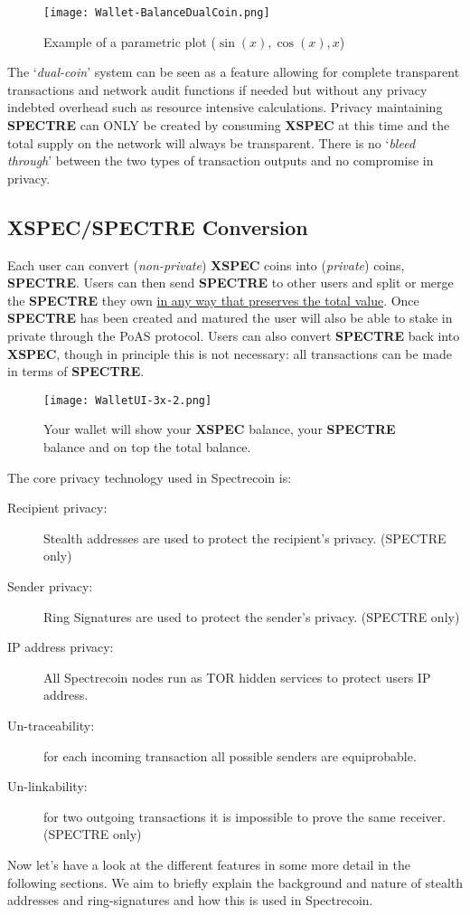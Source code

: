 \begin{figure}[ht]
	\caption{Example of a parametric plot ($\sin (x), \cos(x), x$)}
	\centering
	\texttt{[image: Wallet-BalanceDualCoin.png]}
\end{figure}



The ‘\textit{dual-coin}’ system can be seen as a feature allowing for complete
transparent transactions and network audit functions if needed but
without any privacy indebted overhead such as resource intensive
calculations. Privacy maintaining \textbf{SPECTRE} can ONLY be created by
consuming \textbf{XSPEC} at this time and the total supply on the network
will always be transparent. There is no ‘\textit{bleed through}’ between the
two types of transaction outputs and no compromise in privacy.



\subsection{XSPEC/SPECTRE Conversion}
Each user can convert (\textit{non-private}) \textbf{XSPEC} coins into 
(\textit{private}) coins, \textbf{SPECTRE}. Users can then send \textbf{SPECTRE} 
to other users and split or merge the \textbf{SPECTRE} they own \underline{in any 
way that preserves the total value}. Once \textbf{SPECTRE} has been created
and matured the user will also be able to stake in private through the PoAS
protocol. Users can also convert \textbf{SPECTRE} back into \textbf{XSPEC}, 
though in principle this is not necessary: all transactions can be made in 
terms of \textbf{SPECTRE}.



\begin{figure}[ht]
	\caption{Your wallet will show your \textbf{XSPEC} balance, your 
		\textbf{SPECTRE} balance and on top the total balance.}
	\centering
	\texttt{[image: WalletUI-3x-2.png]}
\end{figure}




The core privacy technology used in Spectrecoin is: 



\begin{description}
	\item[Recipient privacy:] Stealth addresses are used to protect the 
	recipient’s privacy. (SPECTRE only)
	\item[Sender privacy:] Ring Signatures are used to protect the 
	sender’s privacy. (SPECTRE only)
	\item[IP address privacy:] All Spectrecoin nodes run as TOR hidden 
	services to protect users IP address.
	\item[Un-traceability:] for each incoming transaction all possible 
	senders are equiprobable.
	\item[Un-linkability:] for two outgoing transactions it is impossible 
	to prove the same receiver. (SPECTRE only)
\end{description}
         



Now let’s have a look at the different features in some more detail in the
following sections. We aim to briefly explain the background and nature of
stealth addresses and ring-signatures and how this is used in Spectrecoin.
